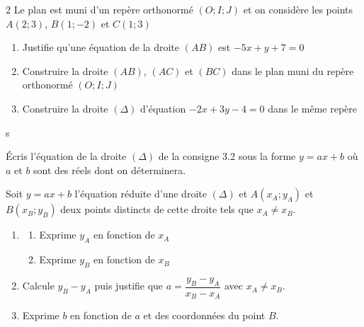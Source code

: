 \begin{multicols*}{2}
  	Le plan est muni d'un repère orthonormé $\left(O; I;J\right)$ et on considère les points $ A(2;3) $, $ B(1;-2) $ et $ C(1;3) $
  	\begin{enumerate}
  		\item Justifie qu'une équation de la droite $ (AB) $ est $ -5x+y+7=0 $
  		\item Construire la droite $ (AB) $, $ (AC) $ et $ (BC) $ dans le plan   muni du repère orthonormé $\left(O; I;J\right)$
  		\item Construire la droite $ (\Delta) $ d'équation $ -2x+3y-4=0 $ dans le même repère
  	\end{enumerate}
  	\dure s
  	 
  	
  	Écris l'équation de la droite  $ (\Delta) $ de la consigne 3.2 sous la forme $y=ax+b$ où $a$ et $b$ sont des réels dont on déterminera.
  	\\
  	\dures
  	 
  	
  	Soit $y=ax+b$ l'équation réduite d'une droite $(\Delta)$ et $A(x_{A};y_{A})$ et $B(x_{B};y_{B})$ deux points distincts de cette droite tels que $x_{A}\neq x_{B}$. 
  	
  	\begin{enumerate}
  		\item 
  		\begin{enumerate}
  			\item Exprime $y_{A}$ en fonction de $x_{A}$ 
  			\item Exprime $y_{B}$ en fonction de $x_{B}$ 
  		\end{enumerate}
  		\item Calcule  $y_{B}- y_{A}$ puis justifie que $a=\dfrac{y_{B}- y_{A}}{x_{B}- x_{A}}$ avec $x_{A}\neq x_{B}$.
  		\item Exprime $b$ en fonction de $a$ et des coordonnées du point $B$.
  	\end{enumerate}
  	\dures 
  	 

\end{multicols*}
